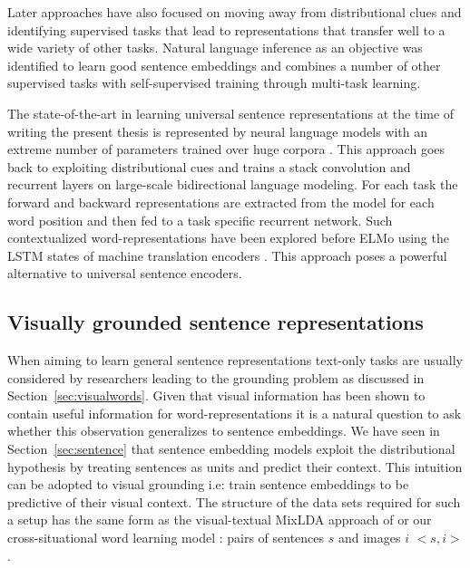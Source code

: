 Later approaches have also focused on moving away from distributional clues
and identifying supervised tasks that lead to representations that transfer
well to a wide variety of other tasks. Natural language inference as an objective
was identified to learn good sentence embeddings \citep{conneau-EtAl:2017:EMNLP2017}
and \cite{subramanian2018learning} combines a number of other supervised tasks
with self-supervised training through multi-task learning.

The state-of-the-art in learning universal sentence representations 
at the time of writing the present thesis is
represented by neural language models with an extreme number of parameters
trained over huge corpora \citep{peters2018deep}. This approach goes back to
exploiting distributional cues and trains a stack convolution and recurrent layers
on large-scale bidirectional language modeling.
For each task the forward and backward representations are extracted from the model
for each word position and then fed to a task specific recurrent network.
Such contextualized word-representations have been explored before ELMo using
the LSTM states of machine translation encoders \citep{mccann2017learned}.
This approach poses a powerful alternative to universal sentence encoders.

\subsection{Visually grounded sentence representations}
\label{sec:visualsentences}

When aiming to learn general sentence representations text-only tasks
are usually considered by researchers leading to the grounding problem
as discussed in Section~\ref{sec:visualwords}. Given that visual information
has been shown to contain useful information for word-representations it
is a natural question to ask whether this observation generalizes to sentence
embeddings. We have seen in Section~\ref{sec:sentence} that sentence embedding
models exploit the distributional hypothesis by treating sentences as units and
predict their context. This intuition can be adopted to visual grounding i.e:
train sentence embeddings to be predictive of their visual context. The
structure of the data sets required for such a setup has the same form
as the visual-textual MixLDA approach of \cite{feng2010visual} or our
cross-situational word learning model \citep{kadar2015learning}:
pairs of sentences $s$ and images $i$ $<s, i>$.

